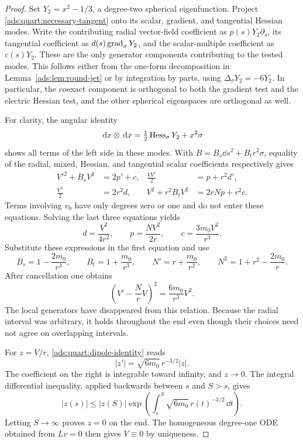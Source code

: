 \begin{proof}
Set \(Y_2=x^2-1/3\), a degree-two spherical eigenfunction.  Project
\eqref{ads:quart:necessary-tangent} onto its scalar, gradient, and
tangential Hessian modes.  Write the contributing radial vector-field
coefficient as \(p(s)Y_2\partial_s\), its tangential coefficient as
\(d(s)\operatorname{grad}_\sigma Y_2\), and the scalar-multiple coefficient as
\(c(s)Y_2\).  These are the only generator components contributing to
the tested modes.  This follows either from the one-form decomposition
in Lemma~\ref{ads:lem:round-jet} or by integration by parts, using
\(\Delta_\sigma Y_2=-6Y_2\).  In particular, the coexact component
is orthogonal to both the gradient test and the electric Hessian
test, and the other spherical eigenspaces are orthogonal as well.

For clarity, the angular identity
\[
 \,\mathrm d x\otimes\,\mathrm d x
       =\tfrac12\operatorname{Hess}_\sigma Y_2+x^2\sigma
\]
shows all terms of the left side in these modes.  With
\(B=B_s\dd s^2+B_t r^2\sigma\), equality of the radial, mixed,
Hessian, and tangential scalar coefficients respectively gives
\begin{align}
 V'^2+B_sV^2&=2p'+c,
 &\frac{VV'}2&=p+r^2d',\nonumber\\
 \frac{V^2}2&=2r^2d,
 &V^2+r^2B_tV^2&=2rNp+r^2c.
 \label{ads:quart:projection-system}
\end{align}
Terms involving \(v_0\) have only degrees zero or one and do not
enter these equations.  Solving the last three equations yields
\[
 d=\frac{V^2}{4r^2},\qquad
 p=\frac{NV^2}{2r},\qquad
 c=\frac{3m_0V^2}{r^3}.
\]
Substitute these expressions in the first equation and use
\[
 B_s=1-\frac{2m_0}{r^3},\qquad
 B_t=1+\frac{m_0}{r^3},\qquad
 N'=r+\frac{m_0}{r^2},\qquad
 N^2=1+r^2-\frac{2m_0}{r}.
\]
After cancellation one obtains
\begin{equation}
 \left(V'-\frac NrV\right)^2
       =\frac{6m_0}{r^3}V^2.
 \label{ads:quart:dipole-identity}
\end{equation}
The local generators have disappeared from this relation.  Because
the radial interval was arbitrary, it holds throughout the end even
though their choices need not agree on overlapping intervals.

For \(z=V/r\), \eqref{ads:quart:dipole-identity} reads
\[
 |z'|=\sqrt{6m_0}\,r^{-3/2}|z|.
\]
The coefficient on the right is integrable toward infinity, and
\(z\to0\).  The integral differential inequality, applied backwards
between \(s\) and \(S>s\), gives
\[
 |z(s)|\leq |z(S)|
       \exp\left(\int_s^S\sqrt{6m_0}\,r(t)^{-3/2}\,\dd t\right).
\]
Letting \(S\to\infty\) proves \(z=0\) on the end.  The homogeneous
degree-one ODE obtained from \(Lv=0\) then gives \(V\equiv0\) by
uniqueness.
\end{proof}

